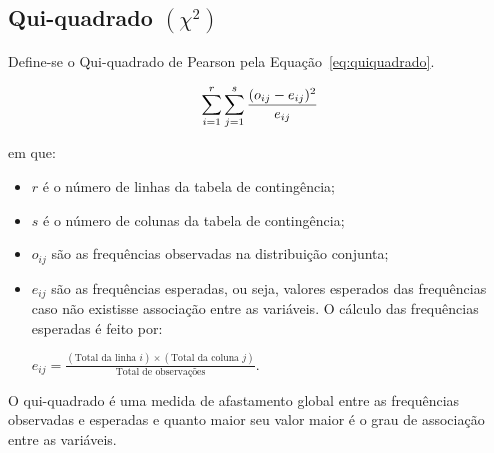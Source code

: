 \documentclass[11pt,fleqn]{book} %
\begin{document}
\subsection{Qui-quadrado $(\chi^2)$}

\vspace{0,3cm}

Define-se o Qui-quadrado de Pearson pela Equação~\ref{eq:quiquadrado}. \\

\begin{eBox}
\vspace{-0.5cm}
\begin{equation} \label{eq:quiquadrado}
\displaystyle \sum_{i=1}^r \sum_{j=1}^s \frac{(o_{ij}-e_{ij})^2}{e_{ij}} \\
\end{equation}
\end{eBox}

\noindent em que:

\begin{itemize}
\item $r$ é o número de linhas da tabela de contingência;
\item $s$ é o número de colunas da tabela de contingência;
\item $o_{ij}$ são as frequências observadas na distribuição conjunta;
\item $e_{ij}$ são as frequências esperadas, ou seja, valores esperados das frequências caso não existisse associação entre as variáveis. O cálculo das frequências esperadas é feito por: \\

\begin{center}
$\displaystyle e_{ij}=\frac{(\textrm{Total da linha } i)\times(\textrm{Total da coluna } j)}{\textrm{Total de observações}}.$
\end{center}

\end{itemize}

O qui-quadrado é uma medida de afastamento global entre as frequências observadas e esperadas e quanto maior seu valor maior é o grau de associação entre as variáveis. \\
\end{document}
